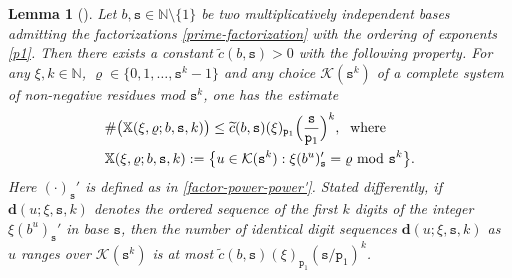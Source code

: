 \documentclass[12pt, twoside]{article}
\newtheorem{lemma}[theorem]{Lemma}
\theoremstyle{definition}
\numberwithin{equation}{section}
\begin{document}
\begin{lemma}[{\cite[Lemma 5A]{s60}}] \label{Schmidt-mult-indep-lemma}
 Let $b, \mathtt s \in \mathbb N \setminus \{1\}$ be two multiplicatively independent bases admitting  the factorizations \eqref{prime-factorization} with the ordering of exponents \eqref{p1}. Then there exists a constant $\widetilde{c}(b, \mathtt s) > 0$ with the following property. For any $\xi, k \in \mathbb N$, $\varrho \in \{0, 1, \ldots, \mathtt s^k-1\}$ and any choice $\mathcal K(\mathtt s^k)$ of a complete system of non-negative residues mod $\mathtt s^k$, one has the estimate 
 \begin{align} 
& \#\bigl( \mathbb X(\xi, \varrho; b, \mathtt s, k) \bigr)  \leq \widetilde{c}(b, \mathtt s) (\xi)_{\mathtt p_1} \Bigl(\frac{\mathtt s}{\mathtt p_1}\Bigr)^k, \; \text{ where } \label{X-cardinality} \\ 
&\mathbb X(\xi, \varrho; b, \mathtt s, k)  := \bigl\{u \in \mathcal K(\mathtt s^k)   : \xi (b^u)_{\mathtt s}' = \varrho \text{ mod } \mathtt s^k \bigr\}. \label{def-X-set}
 \end{align} 
 Here $( \cdot)_{\mathtt s}'$ is defined as in \eqref{factor-power-power'}. 
 \vskip0.1in
\noindent Stated differently, if $\mathbf d(u; \xi, \mathtt s, k)$ denotes the ordered sequence of the first $k$ digits of the integer $\xi (b^u)_{\mathtt s}'$ in base $\mathtt s$, then the number of identical digit sequences  $\mathbf d(u; \xi, \mathtt s, k)$ as $u$ ranges over $\mathcal K(\mathtt s^k)$ is at most $\widetilde{c}(b, \mathtt s) (\xi)_{\mathtt p_1} \left({\mathtt s}/{\mathtt p_1}\right)^k$. 
 \end{lemma}
\end{document}
